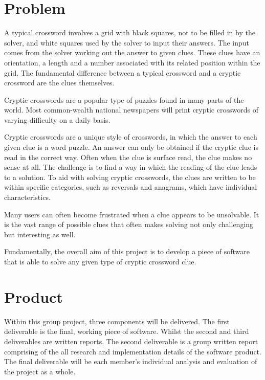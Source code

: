 \section{Problem}

A typical crossword involves a grid with black squares, not to be filled in by
the  solver, and white squares used by the solver to input their answers. The
input comes from the solver working out the answer to given clues. These clues
have an orientation, a length and a number associated with its related position
within the grid. The fundamental difference between a typical crossword and a
cryptic crossword are the clues themselves.

Cryptic crosswords are a popular type of puzzles found in many parts of the
world. Most common-wealth national newspapers will print cryptic crosswords of
varying difficulty on a daily basis.

Cryptic crosswords are a unique style of crosswords, in which the answer to
each given clue is a word puzzle. An answer can only be obtained if the cryptic
clue is read in the correct way. Often when the clue is surface read, the clue
makes no sense at all. The challenge is to find a way in which the reading of
the clue leads to a solution. To aid with solving cryptic crosswords, the clues
are written to be within specific categories, such as reversals and anagrams,
which have individual characteristics.

Many users can often become frustrated when a clue appears to be unsolvable. It
is the vast range of possible clues that often makes solving not only
challenging but interesting as well.

Fundamentally, the overall aim of this project is to develop a piece of
software that is able to solve any given type of cryptic crossword clue.


\section{Product}

Within this group project, three components will be delivered. The first 
deliverable is the final, working piece of software. Whilst the second and third
deliverables are written reports. The second deliverable is a group written 
report comprising of the all research and implementation details of the software
product. The final deliverable will be each member's individual analysis and 
evaluation of the project as a whole.

